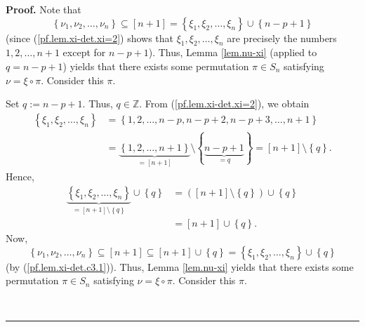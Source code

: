 \documentclass[numbers=enddot,12pt,final,onecolumn,notitlepage,english]{scrartcl}%
\theoremstyle{definition}
\newenvironment{proof}[1][Proof]{\noindent\textbf{#1.} }{\ \rule{0.5em}{0.5em}}
\newenvironment{verlong}{}{}
\newenvironment{vershort}{}{}
\begin{document}
\begin{proof}
\begin{vershort}
Note that%
\[
\left\{  \nu_{1},\nu_{2},\ldots,\nu_{n}\right\}  \subseteq\left[  n+1\right]
=\left\{  \xi_{1},\xi_{2},\ldots,\xi_{n}\right\}  \cup\left\{  n-p+1\right\}
\]
(since (\ref{pf.lem.xi-det.xi=2}) shows that $\xi_{1},\xi_{2},\ldots,\xi_{n}$
are precisely the numbers $1,2,\ldots,n+1$ except for $n-p+1$). Thus, Lemma
\ref{lem.nu-xi} (applied to $q=n-p+1$) yields that there exists some
permutation $\pi\in S_{n}$ satisfying $\nu=\xi\circ\pi$. Consider this $\pi$.
\end{vershort}

\begin{verlong}
Set $q:=n-p+1$. Thus, $q\in\mathbb{Z}$. From (\ref{pf.lem.xi-det.xi=2}), we
obtain%
\begin{align*}
\left\{  \xi_{1},\xi_{2},\ldots,\xi_{n}\right\}   &  =\left\{  1,2,\ldots
,n-p,n-p+2,n-p+3,\ldots,n+1\right\} \\
&  =\underbrace{\left\{  1,2,\ldots,n+1\right\}  }_{=\left[  n+1\right]
}\setminus\left\{  \underbrace{n-p+1}_{=q}\right\}  =\left[  n+1\right]
\setminus\left\{  q\right\}  .
\end{align*}
Hence,%
\begin{align}
\underbrace{\left\{  \xi_{1},\xi_{2},\ldots,\xi_{n}\right\}  }_{=\left[
n+1\right]  \setminus\left\{  q\right\}  }\cup\left\{  q\right\}   &  =\left(
\left[  n+1\right]  \setminus\left\{  q\right\}  \right)  \cup\left\{
q\right\} \nonumber\\
&  =\left[  n+1\right]  \cup\left\{  q\right\}  . \label{pf.lem.xi-det.c3.1}%
\end{align}
Now,
\[
\left\{  \nu_{1},\nu_{2},\ldots,\nu_{n}\right\}  \subseteq\left[  n+1\right]
\subseteq\left[  n+1\right]  \cup\left\{  q\right\}  =\left\{  \xi_{1},\xi
_{2},\ldots,\xi_{n}\right\}  \cup\left\{  q\right\}
\]
(by (\ref{pf.lem.xi-det.c3.1})). Thus, Lemma \ref{lem.nu-xi} yields that there
exists some permutation $\pi\in S_{n}$ satisfying $\nu=\xi\circ\pi$. Consider
this $\pi$.
\end{verlong}


\end{proof}
\end{document}

